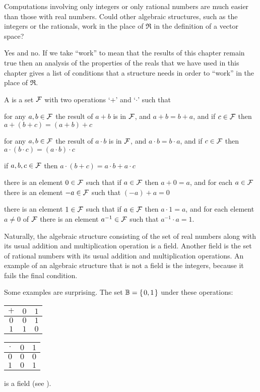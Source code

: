 Computations involving only integers or only rational numbers are much
easier than those with real numbers.
Could other algebraic structures, such as the integers or the rationals,
work in the
place of \( \Re \) in the definition of a vector space?

Yes and no.
If we take ``work'' to mean that the results of this chapter
remain true
then an analysis of the properties of the reals that we have
used in this chapter gives a list of conditions that a structure
needs in order to ``work'' in the place of $\Re$.

A  is a set 
\( \mathcal{F} \) with two operations
`\( + \)'
and `\( \cdot \)' such that
\begin{tfae}
   \item for any \( a,b\in\mathcal{F} \) the result of \( a+b \) is in \( \mathcal{F} \), and
         \( a+b=b+a \), and
         if \( c\in\mathcal{F} \) then \( a+(b+c)=(a+b)+c \)
   \item for any \( a,b\in\mathcal{F} \) the result of \( a\cdot b \) is in \( \mathcal{F} \), and
         \( a\cdot b=b\cdot a \), and
         if \( c\in\mathcal{F} \) then \( a\cdot (b\cdot c)=(a\cdot b)\cdot c \)
   \item if \( a,b,c\in\mathcal{F} \) then \( a\cdot (b+c)=a\cdot b+a\cdot c \)
   \item there is an element \( 0\in\mathcal{F} \) such that
         if \( a\in\mathcal{F} \) then \( a+0=a \), and
         for each \( a\in\mathcal{F} \) there is an element \( -a\in\mathcal{F} \)
                such that \( (-a)+a=0 \)
   \item there is an element \( 1\in\mathcal{F} \) such that
         if \( a\in\mathcal{F} \) then \( a\cdot 1=a \), and
         for each element \( a\neq 0 \) of \( \mathcal{F} \)
                there is an element \( a^{-1}\in\mathcal{F} \)
                such that \( a^{-1}\cdot a=1 \).
\end{tfae}

Naturally, the algebraic structure 
consisting of the set of real numbers along with its usual
addition and multiplication operation is a field.
Another field is the set of rational numbers with its usual addition
and multiplication operations.
An example of an algebraic structure that is not a field is
the integers, because it fails the final condition.

Some examples are surprising.
The set \( \mathbb{B}=\mbox{$\{\hspace{0.1em}0,1\hspace{0.1em}\}$} \) under these operations:
\begin{center}
  \begin{tabular}{c|cc}
    \( + \) &\( 0 \) &\( 1 \) \\
    \hline
    \( 0 \) &\( 0 \) &\( 1 \) \\
    \( 1 \) &\( 1 \) &\( 0 \)
  \end{tabular}
  \qquad
  \begin{tabular}{c|cc}
    \( \cdot \) &\( 0 \) &\( 1 \) \\
     \hline
       \( 0 \)  &\( 0 \) &\( 0 \)  \\
       \( 1 \)  &\( 0 \) &\( 1 \)
  \end{tabular}
\end{center}
is a field (see ).

